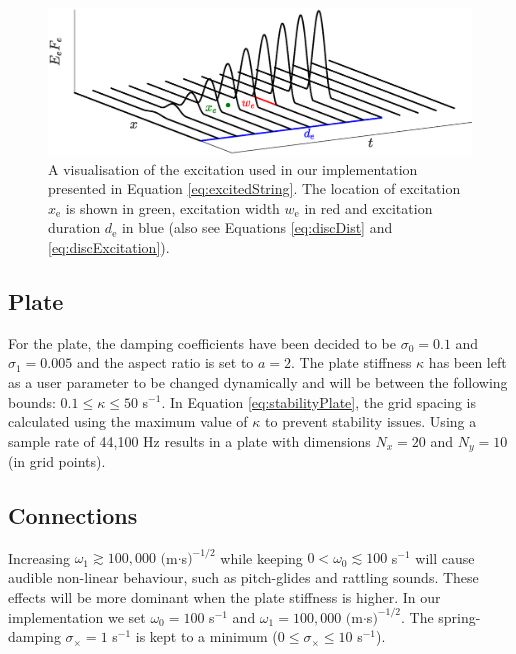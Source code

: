 \begin{figure}[h]
\centering
\includegraphics[width=\paperFigWidth\textwidth]{figures/excitation2.eps}
\caption{A visualisation of the excitation used in our implementation presented in Equation \eqref{eq:excitedString}. The location of excitation $x_\text{e}$ is shown in green, excitation width $w_\text{e}$ in red and excitation duration $d_\text{e}$ in blue (also see Equations \eqref{eq:discDist} and \eqref{eq:discExcitation}). \label{fig:exctiation}}
\end{figure}

\subsection{Plate}
For the plate, the damping coefficients have been decided to be $\sigma_0 = 0.1$ and $\sigma_1 = 0.005$ and the aspect ratio is set to $a = 2$. The plate stiffness $\kappa$ has been left as a user parameter to be changed dynamically and will be between the following bounds: $0.1 \leq \kappa \leq 50$ s$^{-1}$. In Equation \eqref{eq:stabilityPlate}, the grid spacing is calculated using the maximum value of $\kappa$ to prevent stability issues. Using a sample rate of 44,100 Hz results in a plate with dimensions $N_x = 20$ and $N_y = 10$ (in grid points).

\subsection{Connections}
Increasing $\omega_1 \gtrsim 100,000$ $($m$\cdot$s$)^{-1/2}$ while keeping $0 < \omega_0 \lesssim 100$ s$^{-1}$ will cause audible non-linear behaviour, such as pitch-glides and rattling sounds. These effects will be more dominant when the plate stiffness is higher. %
In our implementation we set $\omega_0=100$ s$^{-1}$ and $\omega_1 = 100,000$ $($m$\cdot$s$)^{-1/2}$. The spring-damping $\sigma_\times = 1$ s$^{-1}$ is kept to a minimum ($0 \leq \sigma_\times \leq 10$ s$^{-1}$). 

